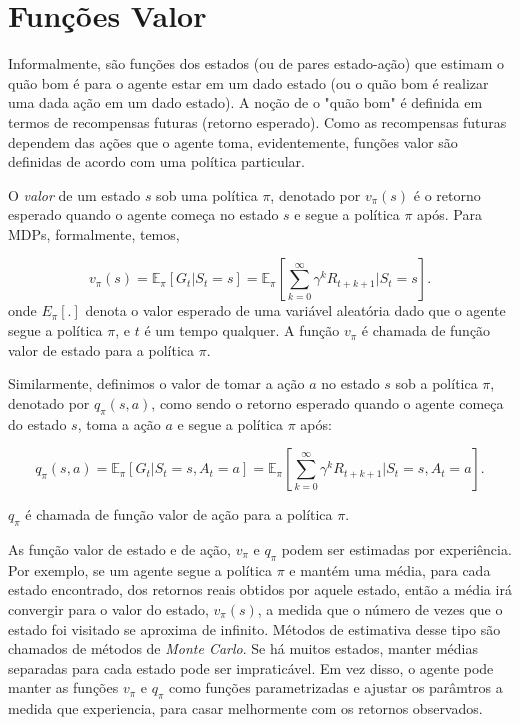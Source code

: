 \documentclass{article}
\begin{document}
\section{Funções Valor}

Informalmente,  são funções dos estados (ou de pares estado-ação) que estimam o quão bom é para o agente estar em um dado estado (ou o quão bom é realizar uma dada ação em um dado estado). A noção de o "quão bom" é definida em termos de recompensas futuras (retorno esperado). Como as recompensas futuras dependem das ações que o agente toma, evidentemente, funções valor são definidas de acordo com uma política particular. 

O \textit{valor} de um estado $s$ sob uma política $\pi$, denotado por $v_{\pi}(s)$ é o retorno esperado quando o agente começa no estado $s$ e segue a política $\pi$ após. Para MDPs, formalmente, temos,

\[
  v_{\pi}(s)=\mathbb{E}_{\pi}[G_t | S_t=s]=\mathbb{E}_{\pi}[\sum_{k=0}^{\infty} {\gamma}^k R_{t+k+1} | S_t = s] 
.\] 
onde $E_{\pi}[.]$ denota o valor esperado de uma variável aleatória dado que o agente segue a política $\pi$, e $t$ é um tempo qualquer. A função $v_{\pi}$ é chamada de função valor de estado para a política $\pi$.

Similarmente, definimos o valor de tomar a ação $a$ no estado $s$ sob a política $\pi$, denotado por $q_{\pi}(s,a)$, como sendo o retorno esperado quando o agente começa do estado $s$, toma a ação $a$ e segue a política $\pi$ após:

\[
  q_{\pi}(s,a)=\mathbb{E}_{\pi}[G_t | S_t=s,A_t=a]=\mathbb{E}_{\pi}[\sum_{k=0}^{\infty}{\gamma}^kR_{t+k+1}| S_t=s, A_t=a] 
.\] 

$q_{\pi}$ é chamada de função valor de ação para a política $\pi$.

As função valor de estado e de ação, $v_{\pi}$ e $q_{\pi}$ podem ser estimadas por experiência. Por exemplo, se um agente segue a política $\pi$ e mantém uma média, para cada estado encontrado, dos retornos reais obtidos por aquele estado, então a média irá convergir para o valor do estado, $v_{\pi}(s)$, a medida que o número de vezes que o estado foi visitado se aproxima de infinito. Métodos de estimativa desse tipo são chamados de métodos de \textit{Monte Carlo}. Se há muitos estados, manter médias separadas para cada estado pode ser impraticável. Em vez disso, o agente pode manter as funções $v_{\pi}$ e $q_{\pi}$ como funções parametrizadas e ajustar os parâmtros a medida que experiencia, para casar melhormente com os retornos observados. 
\end{document}
